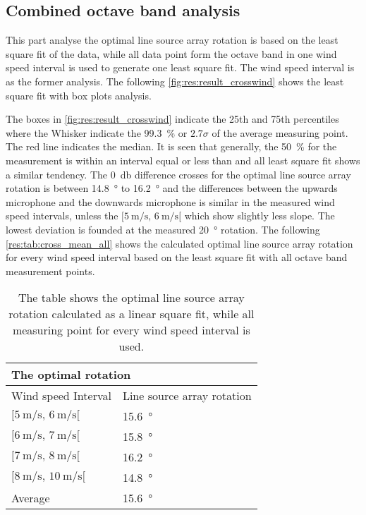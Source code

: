 \subsection{Combined octave band analysis}\label{res:ana:comb}
This part analyse the optimal line source array rotation is based on the least square fit of the data, while all data point form the octave band in one wind speed interval is used to generate one least square fit. The wind speed interval is as the former analysis. The following \autoref{fig:res:result_crosswind} shows the least square fit with box plots analysis. 
 
 
 

 

The boxes in \autoref{fig:res:result_crosswind} indicate the 25th and 75th percentiles where the Whisker indicate the \SI{99.3}{\percent} or $2.7\sigma$ of the average measuring point. The red line indicates the median. It is seen that generally, the \SI{50}{\percent} for the measurement is within an interval equal or less than  and all least square fit shows a similar tendency. The \SI{0}{\decibel} difference crosses for the optimal line source array rotation is between \SI{14.8}{\degree} to \SI{16.2}{\degree} and the differences between the upwards microphone and the downwards microphone is similar in the measured wind speed intervals, unless the $[\SI{5}{\meter\per\second},\, \SI{6}{\meter\per\second}[ $ which show slightly less slope. The lowest deviation is founded at the measured \SI{20}{\degree} rotation. The following \autoref{res:tab:cross_mean_all} shows the calculated optimal line source array rotation for every wind speed interval based on the least square fit with all octave band measurement points.
 
 
 \begin{table}[H]
 \centering
 \caption{The table shows the optimal line source array rotation calculated as a linear square fit, while all measuring point for every wind speed interval is used.}
\begin{tabular}{l|l}
\multicolumn{2}{l}{The optimal rotation}      \\ \hline
Wind speed Interval & Line source array rotation \\ \hline
  $[\SI{5}{\meter\per\second},\, \SI{6}{\meter\per\second}[ $       &   \SI{15.6}{\degree}    \\
   $[\SI{6}{\meter\per\second},\, \SI{7}{\meter\per\second}[ $     &   \SI{15.8}{\degree}     \\
  $[\SI{7}{\meter\per\second},\, \SI{8}{\meter\per\second}[ $       &    \SI{16.2}{\degree}    \\
   $[\SI{8}{\meter\per\second},\, \SI{10}{\meter\per\second}[ $      &     \SI{14.8}{\degree}  \\ \hline
    Average      &     \SI{15.6}{\degree} 
\end{tabular}
\label{res:tab:cross_mean_all}
\end{table}     

